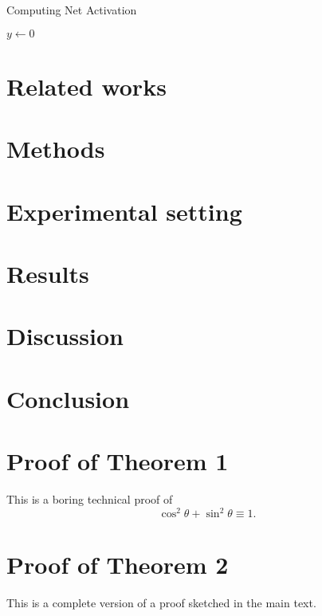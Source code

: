 \documentclass{midl} %
\begin{document}
\begin{algorithm2e}
\caption{Computing Net Activation}
\label{alg:net}
{}
$y\leftarrow 0$\;
\end{algorithm2e}

\section{Related works}

\section{Methods}

\section{Experimental setting}

\section{Results}

\section{Discussion}

\section{Conclusion}

\clearpage  %




\appendix

\section{Proof of Theorem 1}

This is a boring technical proof of
\begin{equation}\label{eq:example}
\cos^2\theta + \sin^2\theta \equiv 1.
\end{equation}

\section{Proof of Theorem 2}

This is a complete version of a proof sketched in the main text.
\end{document}

